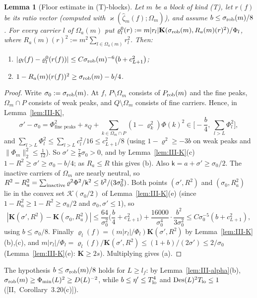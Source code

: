\documentclass[10pt]{amsart}
\newtheorem{lemma}[theorem]{Lemma}
\theoremstyle{definition}
\theoremstyle{remark}
\begin{document}
\begin{lemma}[Floor estimate in (T)-blocks]\label{lem:III-Tblock}
Let $m$ be a block of kind \textup{(T)}, let $r(f)$ be its ratio vector
\textup{(}computed with $\varkappa(\hat\zeta_m(f);\Omega_m)$\textup{)}, and
assume $b\le\sigma_{\rm rob}(m)/8$.  For every carrier $l$ of $\Omega_a(m)$ put
$\varrho^0_l(r):=m|r_l|\mathbf K(\sigma_{\rm rob}(m),R_a(m)(r)^2)/\Phi_l$, where
$R_a(m)(r)^2:=m^2\sum_{l\in\Omega_a(m)}r_l^2$.  Then:
\begin{enumerate}
\item[(a)] $|\varrho_l(f)-\varrho^0_l(r(f))|\le C\sigma_{\rm rob}(m)^{-6}\big(b+
c_{L+1}^2\big)$;
\item[(b)] $1-R_a(m)(r(f))^2\ge\sigma_{\rm rob}(m)-b/4$.
\end{enumerate}
\end{lemma}

\begin{proof}
Write $\sigma_0:=\sigma_{\rm rob}(m)$.  At $f$, $P\setminus\Omega_m$ consists of
$P_{\rm rob}(m)$ and the fine peaks, $\Omega_m\cap P$ consists of weak peaks,
and $Q\setminus\Omega_m$ consists of fine carriers.  Hence, in
Lemma~\ref{lem:III-K},
\[
 \sigma'-\sigma_0=\Phi^2_{\text{fine peaks}}+s_Q+\sum_{k\in\Omega_m\cap P}
 (1-\varrho_k^2)\Phi(k)^2\in\Big[-\frac b4,\ \sum_{l>L}\Phi_l^2\Big],
\]
and $\sum_{l>L}\Phi_l^2\le\sum_{l>L}c_l^2/16\le c_{L+1}^2/8$ (using
$1-\varrho^2\ge-3b$ on weak peaks and $\|\Phi_m\|_2^2\le\frac1{12}$).  So
$\sigma'\ge\frac78\sigma_0>0$, and by Lemma~\ref{lem:III-K}(c) $1-R^2\ge\sigma'
\ge\sigma_0-b/4$; as $R_a\le R$ this gives (b).  Also $\mathsf k=a+\sigma'\ge
\sigma_0/2$.  The inactive carriers of $\Omega_m$ are nearly neutral, so
$R^2-R_a^2=\sum_{\rm inactive}\varrho^2\Phi^2/\mathsf k^2\le b^2/(3\sigma_0^2)$.
Both points $(\sigma',R^2)$ and $(\sigma_0,R_a^2)$ lie in the convex set
$\mathcal K(\sigma_0/2)$ of Lemma~\ref{lem:III-K}(e) (since $1-R_a^2\ge1-R^2
\ge\sigma_0/2$ and $\sigma_0,\sigma'\le1$), so
\[
 |\mathbf K(\sigma',R^2)-\mathbf K(\sigma_0,R_a^2)|\le\frac{64}{\sigma_0^2}
 \Big(\frac b4+c_{L+1}^2\Big)+\frac{16000}{\sigma_0^4}\cdot\frac{b^2}{3\sigma_0^2}
 \le C\sigma_0^{-5}(b+c_{L+1}^2),
\]
using $b\le\sigma_0/8$.  Finally $\varrho_l(f)=(m|r_l|/\Phi_l)\mathbf K(\sigma',
R^2)$ by Lemma~\ref{lem:III-K}(b),(c), and $m|r_l|/\Phi_l=\varrho_l(f)/
\mathbf K(\sigma',R^2)\le(1+b)/(2\sigma')\le2/\sigma_0$ (Lemma~\ref{lem:III-K}(e):
$\mathbf K\ge2s$).  Multiplying gives (a).
\end{proof}

The hypothesis $b\le\sigma_{\rm rob}(m)/8$ holds for $L\ge l_f$: by
Lemma~\ref{lem:III-alpha}(b), $\sigma_{\rm rob}(m)\ge\Phi_{\min}(L)^2\ge D(L)^{-2}$,
while $b\le\eta'\le T_{\rm lo}^4$ and $\mathrm{Des}(L)^2T_{\rm lo}\le1$
([II,~Corollary~3.20(c)]).
\end{document}
